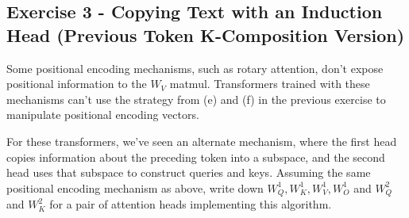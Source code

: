 \documentclass[11pt]{article}
\begin{document}
\subsection*{Exercise 3 - Copying Text with an Induction Head (Previous Token K-Composition Version)}

Some positional encoding mechanisms, such as rotary attention, don't expose positional information to the $W_V$ matmul. Transformers trained with these mechanisms can't use the strategy from (e) and (f) in the previous exercise to manipulate positional encoding vectors.

For these transformers, we've seen an alternate mechanism, where the first head copies information about the preceding token into a subspace, and the second head uses that subspace to construct queries and keys. Assuming the same positional encoding mechanism as above, write down $W_Q^{1},W_K^{1},W_V^{1},W_O^{1}$ and $W_Q^{2}$ and $W_K^{2}$ for a pair of attention heads implementing this algorithm.
\end{document}
